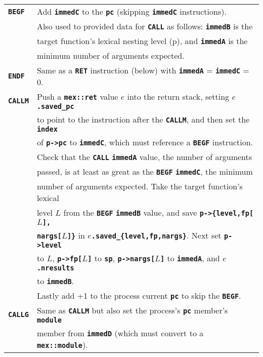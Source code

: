 \documentclass[12pt]{article}
\newcommand{\TT}[1]{{\tt \bfseries #1}}
\newcommand{\pagref}[1]{p\pageref{#1}}
\newlength{\figurewidth}
\newenvironment{boxedfigure}[1][!btp]%
	{\begin{figure*}[#1]
	 \begin{lrbox}{\figurebox}
	 \begin{minipage}{\figurewidth}

	 \vspace*{1ex}}%
	{
	 \vspace*{1ex}

	 \end{minipage}
	 \end{lrbox}

	 \centering
	 \fbox{\hspace*{0.1in}\usebox{\figurebox}\hspace*{0.1in}}
	 \end{figure*}}
\begin{document}
\begin{boxedfigure}

\begin{center}
\begin{tabular}{|l|l|}
\hline
\TT{BEGF}
    & Add \TT{immedC} to the \TT{pc} (skipping \TT{immedC} instructions).
    \\[0.5ex]
    & Also used to provided data for \TT{CALL} as follows: \TT{immedB} is the \\
    & target function's lexical nesting level (\pagref{LEXICAL-NESTING-LEVEL}),
      and \TT{immedA} is the \\
    & minimum number of arguments expected.
\\\hline
\TT{ENDF}
    & Same as a \TT{RET} instruction (below) with
      \TT{immedA} = \TT{immedC} = 0. 
\\\hline
\TT{CALLM}
    & Push a \TT{mex::ret} value $e$ into the return stack, setting
      \TT{$e$.saved\_pc} \\
    & to point to the instruction after the \TT{CALLM}, and then
      set the \TT{index} \\
    & of \TT{p->pc} to \TT{immedC}, which must reference a
      \TT{BEGF} instruction.
    \\[0.5ex]
    & Check that the \TT{CALL} \TT{immedA} value, the number of arguments \\
    & passed, is at least as great as the \TT{BEGF}
      \TT{immedC}, the minimum \\
    & number of arguments expected.  Take the target 
      function's lexical \\
    & level $L$ from the \TT{BEGF} \TT{immedB} value, and save
      \TT{p->\{level,fp[$L$],} \\
    & \TT{nargs[$L$]\}} in \TT{$e$.saved\_\{level,fp,nargs\}}.
       Next set \TT{p->level} \\
    & to $L$, \TT{p->fp[$L$]} to \TT{sp}, \TT{p->nargs[$L$]} to \TT{immedA},
      and \TT{$e$.nresults} \\
    & to \TT{immedB}.
    \\[0.5ex]
    & Lastly add +1 to the process current \TT{pc} to skip the \TT{BEGF}.
\\\hline
\TT{CALLG}
    & Same as \TT{CALLM} but also set the process's \TT{pc} member's 
                                                           \TT{module} \\
    & member from \TT{immedD} (which must convert to a \TT{mex::module}).
\\\hline

\end{tabular}
\end{center}
\end{boxedfigure}
\end{document}
